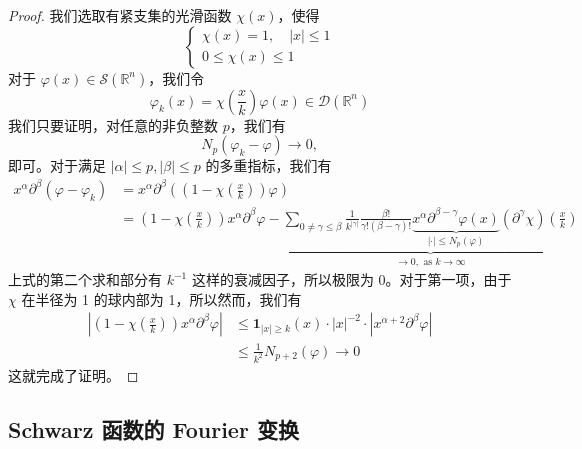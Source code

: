 \begin{proof}
我们选取有紧支集的光滑函数 $\chi(x)$，使得
\[
\left\{\begin{array}{l}
\chi(x)=1, \quad|x| \leqslant 1 \\
0 \leqslant \chi(x) \leqslant 1
\end{array}\right.
\]
对于 $\varphi(x) \in \mathcal{S}\left(\mathbb{R}^n\right)$，我们令
\[
\varphi_k(x)=\chi\left(\frac{x}{k}\right) \varphi(x) \in \mathcal{D}\left(\mathbb{R}^n\right)
\]
我们只要证明，对任意的非负整数 $p$，我们有
\[
N_p\left(\varphi_k-\varphi\right) \rightarrow 0,
\]
即可。对于满足 $|\alpha| \leqslant p,|\beta| \leqslant p$ 的多重指标，我们有
\[
\begin{aligned}
x^\alpha \partial^\beta\left(\varphi-\varphi_k\right) & =x^\alpha \partial^\beta\left(\left(1-\chi\left(\frac{x}{k}\right)\right) \varphi\right) \\
& =\left(1-\chi\left(\frac{x}{k}\right)\right) x^\alpha \partial^\beta \varphi-\underbrace{ \sum_{0 \neq \gamma \leqslant \beta} \frac{1}{k^{|\gamma|}} \frac{\beta!}{\gamma!(\beta-\gamma)!} \underbrace{x^\alpha \partial^{\beta-\gamma} \varphi(x)}_{|\cdot| \leqslant N_p(\varphi)}\left(\partial^\gamma \chi\right)\left(\frac{x}{k}\right) }_{ \to0,\text{ as }k\to \infty }
\end{aligned}
\]
上式的第二个求和部分有 $k^{-1}$ 这样的衰减因子，所以极限为 0。对于第一项，由于 $\chi$ 在半径为 1 的球内部为 1，所以然而，我们有
\[
\begin{aligned}
\left|\left(1-\chi\left(\frac{x}{k}\right)\right) x^\alpha \partial^\beta \varphi\right| & \leqslant \mathbf{1}_{|x| \geqslant k}(x) \cdot|x|^{-2} \cdot\left|x^{\alpha+2} \partial^\beta \varphi\right| \\
& \leqslant \frac{1}{k^2} N_{p+2}(\varphi) \rightarrow 0
\end{aligned}
\]
这就完成了证明。
\end{proof}

\subsection{Schwarz 函数的 Fourier 变换}

